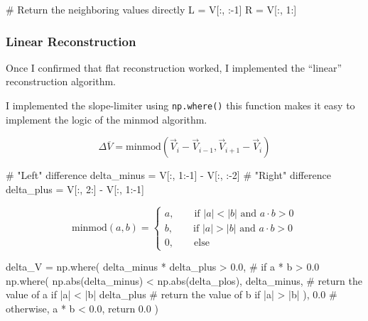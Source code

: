 \documentclass[
  letterpaper,
]{article}
\newenvironment{Shaded}{\begin{snugshade}}{\end{snugshade}}
\newcommand{\BuiltInTok}[1]{\textcolor[rgb]{0.00,0.23,0.31}{#1}}
\newcommand{\CommentTok}[1]{\textcolor[rgb]{0.37,0.37,0.37}{#1}}
\newcommand{\DecValTok}[1]{\textcolor[rgb]{0.68,0.00,0.00}{#1}}
\newcommand{\FloatTok}[1]{\textcolor[rgb]{0.68,0.00,0.00}{#1}}
\newcommand{\NormalTok}[1]{\textcolor[rgb]{0.00,0.23,0.31}{#1}}
\newcommand{\OperatorTok}[1]{\textcolor[rgb]{0.37,0.37,0.37}{#1}}
\begin{document}
\begin{Shaded}
\begin{Highlighting}[]
\CommentTok{\# Return the neighboring values directly}
\NormalTok{L }\OperatorTok{=}\NormalTok{ V[:, :}\OperatorTok{{-}}\DecValTok{1}\NormalTok{]}
\NormalTok{R }\OperatorTok{=}\NormalTok{ V[:, }\DecValTok{1}\NormalTok{:]}
\end{Highlighting}
\end{Shaded}

\subsubsection{Linear Reconstruction}\label{linear-reconstruction}

Once I confirmed that flat reconstruction worked, I implemented the
``linear'' reconstruction algorithm.

I implemented the slope-limiter using \texttt{np.where()} this function
makes it easy to implement the logic of the \(\mathrm{minmod}\)
algorithm.

\[
\Delta \overline{V} = 
\mathrm{minmod}(
\vec{V}_{i} - \vec{V}_{i-1},
\vec{V}_{i+1} - \vec{V}_{i}
)
\]

\begin{Shaded}
\begin{Highlighting}[]
\CommentTok{\# "Left" difference}
\NormalTok{delta\_minus }\OperatorTok{=}\NormalTok{ V[:, }\DecValTok{1}\NormalTok{:}\OperatorTok{{-}}\DecValTok{1}\NormalTok{] }\OperatorTok{{-}}\NormalTok{ V[:, :}\OperatorTok{{-}}\DecValTok{2}\NormalTok{]}
\CommentTok{\# "Right" difference}
\NormalTok{delta\_plus }\OperatorTok{=}\NormalTok{ V[:, }\DecValTok{2}\NormalTok{:] }\OperatorTok{{-}}\NormalTok{ V[:, }\DecValTok{1}\NormalTok{:}\OperatorTok{{-}}\DecValTok{1}\NormalTok{]}
\end{Highlighting}
\end{Shaded}

\[
\mathrm{minmod}(a,b) = 
\begin{cases}
a, \qquad \text{if } |a| < |b| \text{ and } a \cdot b > 0 \\ 
b, \qquad \text{if } |a| > |b| \text{ and } a \cdot b > 0 \\
0, \qquad \text{else} 
\end{cases}
\]

\begin{Shaded}
\begin{Highlighting}[]
\NormalTok{delta\_V }\OperatorTok{=}\NormalTok{ np.where(}
\NormalTok{        delta\_minus }\OperatorTok{*}\NormalTok{ delta\_plus }\OperatorTok{\textgreater{}} \FloatTok{0.0}\NormalTok{, }\CommentTok{\# if a * b \textgreater{} 0.0}
\NormalTok{        np.where(}
\NormalTok{            np.}\BuiltInTok{abs}\NormalTok{(delta\_minus) }\OperatorTok{\textless{}}\NormalTok{ np.}\BuiltInTok{abs}\NormalTok{(delta\_plos),}
\NormalTok{            delta\_minus, }\CommentTok{\# return the value of a if |a| \textless{} |b|}
\NormalTok{            delta\_plus   }\CommentTok{\# return the value of b if |a| \textgreater{} |b|}
\NormalTok{        ),}
        \FloatTok{0.0} \CommentTok{\# otherwise, a * b \textless{} 0.0, return 0.0}
\NormalTok{    )}
\end{Highlighting}
\end{Shaded}
\end{document}
